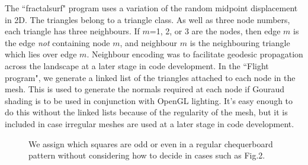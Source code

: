\documentclass[12pt]{article}
\begin{document}
 The ``fractalsurf" program uses a variation of the random midpoint displacement in 2D. The triangles belong to 
a triangle class. As well as three node numbers, each triangle has three neighbours.
 If $m$=1, 2, or 3 are the nodes, then edge $m$ is the edge {\it not} containing node $m$,
and neighbour $m$ is the neighbouring triangle which lies over edge $m$. Neighbour encoding was
 to facilitate
 geodesic propagation across the landscape at a later stage in code development. In the ``Flight program", we generate
a linked list of the triangles attached to each node in the mesh. This is used to generate
the normals required at each node if Gouraud shading is to be used in conjunction with OpenGL lighting.
It's easy enough to do this without the linked lists because of the regularity of the mesh, but it is
included in case irregular meshes are used at a later stage in code development.


\begin{figure}[htb]
\vspace*{10cm}
\caption{ We assign which squares are odd or even in a regular chequerboard pattern without considering
 how to decide in cases such as Fig.2.
}
\end{figure}



 



\end{document}
